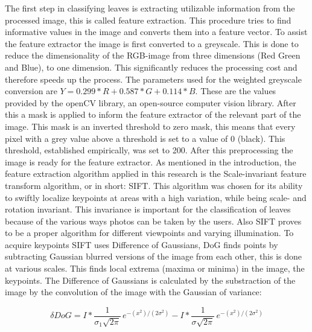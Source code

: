 
The first step in classifying leaves is extracting utilizable information from the processed image, this is called feature extraction. This procedure tries to find informative values in the image and converts them into a feature vector. To assist the feature extractor the image is first converted to a greyscale. This is done to reduce the dimensionality of the RGB-image from three dimensions (Red Green and Blue), to one dimension. This significantly reduces the processing cost and therefore speeds up the process. The parameters used for the weighted greyscale conversion are $Y = 0.299 * R + 0.587 * G+0.114 * B$. These are the values provided by the openCV library, an open-source computer vision library. After this a mask is applied to inform the feature extractor of the relevant part of the image. This mask is an inverted threshold to zero mask, this means that every pixel with a grey value above a threshold is set to a value of 0 (black). This threshold, established empirically, was set to 200. After this preprocessing the image is ready for the feature extractor. As mentioned in the introduction, the feature extraction algorithm applied in this research is the Scale-invariant feature transform algorithm, or in short: SIFT. This algorithm was chosen for its ability to swiftly localize keypoints at areas with a high variation, while being scale- and rotation invariant. This invariance is important for the classification of leaves because of the various ways photos can be taken by the users. Also SIFT proves to be a proper algorithm for different viewpoints and varying illumination. To acquire keypoints SIFT uses Difference of Gaussians, DoG finds points by subtracting Gaussian blurred versions of the image from each other, this is done at various scales. This finds local extrema (maxima or minima) in the image, the keypoints. The Difference of Gaussians is calculated by the substraction of the image by the convolution of the image with the Gaussian of variance:


\[\delta DoG 
=
I*\frac{1}{\sigma_1\sqrt{2\pi}} \, e^{-(x^2)/(2\sigma^2)}-I*\frac{1}{\sigma\sqrt{2\pi}} \, e^{-(x^2)/(2\sigma^2)}\]
 
